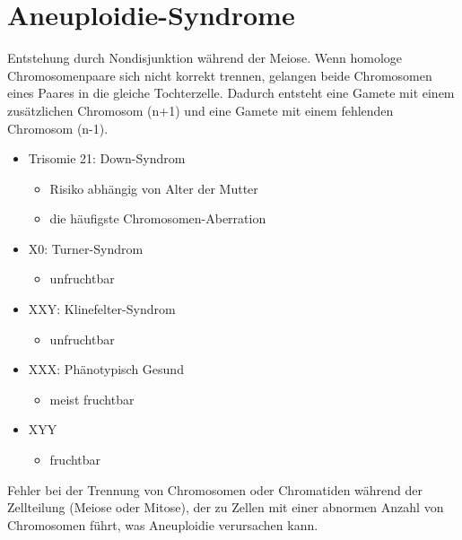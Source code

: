 \documentclass{article}
\begin{document}
\section{Aneuploidie-Syndrome}
Entstehung durch Nondisjunktion während der Meiose. \newline
Wenn homologe Chromosomenpaare sich nicht korrekt trennen, gelangen beide Chromosomen eines Paares in die gleiche Tochterzelle. Dadurch entsteht eine Gamete mit einem zusätzlichen Chromosom (n+1) und eine Gamete mit einem fehlenden Chromosom (n-1).
\begin{itemize}
    \item Trisomie 21: Down-Syndrom
    \begin{itemize}
        \item Risiko abhängig von Alter der Mutter
        \item die häufigste Chromosomen-Aberration
    \end{itemize}
    \item X0: Turner-Syndrom
    \begin{itemize}
        \item unfruchtbar
    \end{itemize}
    \item XXY: Klinefelter-Syndrom
    \begin{itemize}
        \item unfruchtbar
    \end{itemize}
    \item XXX: Phänotypisch Gesund
    \begin{itemize}
        \item meist fruchtbar
    \end{itemize}
    \item XYY
    \begin{itemize}
        \item fruchtbar
    \end{itemize}
\end{itemize}
\begin{mybox}[title=Nondisjunktion]
Fehler bei der Trennung von Chromosomen oder Chromatiden während der Zellteilung (Meiose oder Mitose), der zu Zellen mit einer abnormen Anzahl von Chromosomen führt, was Aneuploidie verursachen kann.
\end{mybox}
\end{document}
